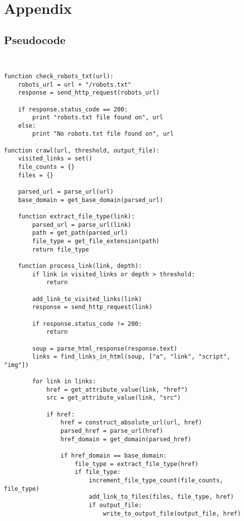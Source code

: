 \documentclass{article}
\begin{document}
\section{Appendix}
\subsection{Pseudocode}
\label{sec:code}
\begin{verbatim}
    

function check_robots_txt(url):
    robots_url = url + "/robots.txt"
    response = send_http_request(robots_url)
    
    if response.status_code == 200:
        print "robots.txt file found on", url
    else:
        print "No robots.txt file found on", url

function crawl(url, threshold, output_file):
    visited_links = set()
    file_counts = {}
    files = {}
    
    parsed_url = parse_url(url)
    base_domain = get_base_domain(parsed_url)
    
    function extract_file_type(link):
        parsed_url = parse_url(link)
        path = get_path(parsed_url)
        file_type = get_file_extension(path)
        return file_type
    
    function process_link(link, depth):
        if link in visited_links or depth > threshold:
            return
        
        add_link_to_visited_links(link)
        response = send_http_request(link)
        
        if response.status_code != 200:
            return
        
        soup = parse_html_response(response.text)
        links = find_links_in_html(soup, ["a", "link", "script", "img"])
        
        for link in links:
            href = get_attribute_value(link, "href")
            src = get_attribute_value(link, "src")
            
            if href:
                href = construct_absolute_url(url, href)
                parsed_href = parse_url(href)
                href_domain = get_domain(parsed_href)
                
                if href_domain == base_domain:
                    file_type = extract_file_type(href)
                    if file_type:
                        increment_file_type_count(file_counts, file_type)
                        add_link_to_files(files, file_type, href)
                        if output_file:
                            write_to_output_file(output_file, href)
                    

\end{verbatim}
\end{document}
